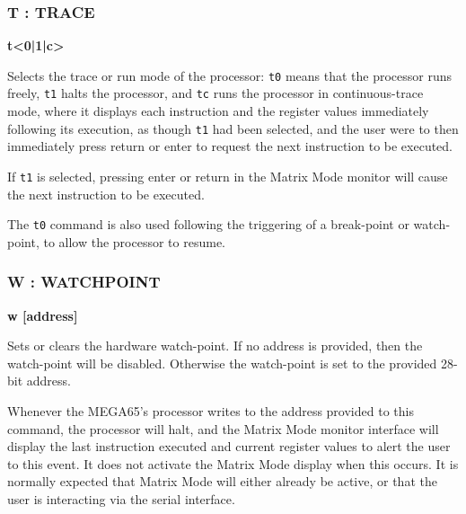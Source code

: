 \subsubsection{T : TRACE}
\begin{description}[leftmargin=2cm,style=nextline]
\item [Format:] {\bf t<0|1|c>}
\item [Usage:] Selects the trace or run mode of the processor: {\tt t0} means that the
  processor runs freely, {\tt t1} halts the processor, and {\tt tc} runs the processor
  in continuous-trace mode, where it displays each instruction and the register values
  immediately following its execution, as though {\tt t1} had been selected, and the user
  were to then immediately press return or enter to request the next instruction to be
  executed.

  If {\tt t1} is selected, pressing enter or return in the Matrix Mode monitor will cause
  the next instruction to be executed.

  The {\tt t0} command is also used following the triggering of a break-point or watch-point,
  to allow the processor to resume.
  
\end{description}

\subsubsection{W : WATCHPOINT}
\begin{description}[leftmargin=2cm,style=nextline]
\item [Format:] {\bf w [address]}
\item [Usage:] Sets or clears the hardware watch-point. If no address is provided,
  then the watch-point will be disabled. Otherwise the watch-point is set to the
  provided 28-bit address.

  Whenever the MEGA65's processor writes to the address
  provided to this command, the processor will halt, and the Matrix Mode monitor interface
  will display the last instruction executed and current register values to alert the user
  to this event.  It does not activate the Matrix Mode display when this occurs.
  It is
  normally expected that Matrix Mode will either already be active, or that the user is
  interacting via the serial interface.

\end{description}

